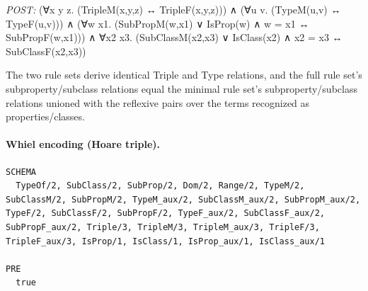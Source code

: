 \documentclass[10pt]{article}
\begin{document}
\textit{POST:} (∀x y z. (TripleM(x,y,z) ↔ TripleF(x,y,z))) ∧ (∀u v. (TypeM(u,v) ↔ TypeF(u,v))) ∧ (∀w x1. (SubPropM(w,x1) ∨ IsProp(w) ∧ w = x1 ↔ SubPropF(w,x1))) ∧ ∀x2 x3. (SubClassM(x2,x3) ∨ IsClass(x2) ∧ x2 = x3 ↔ SubClassF(x2,x3))\par The two rule sets derive identical Triple and Type relations, and the full rule set's subproperty/subclass relations equal the minimal rule set's subproperty/subclass relations unioned with the reflexive pairs over the terms recognized as properties/classes.

\paragraph{Whiel encoding (Hoare triple).}

\begin{Verbatim}[fontsize=\tiny,breaklines=true,breakanywhere=true,frame=single,framesep=1.5mm]
SCHEMA
  TypeOf/2, SubClass/2, SubProp/2, Dom/2, Range/2, TypeM/2, SubClassM/2, SubPropM/2, TypeM_aux/2, SubClassM_aux/2, SubPropM_aux/2, TypeF/2, SubClassF/2, SubPropF/2, TypeF_aux/2, SubClassF_aux/2, SubPropF_aux/2, Triple/3, TripleM/3, TripleM_aux/3, TripleF/3, TripleF_aux/3, IsProp/1, IsClass/1, IsProp_aux/1, IsClass_aux/1

PRE
  true 


\end{Verbatim}
\end{document}
